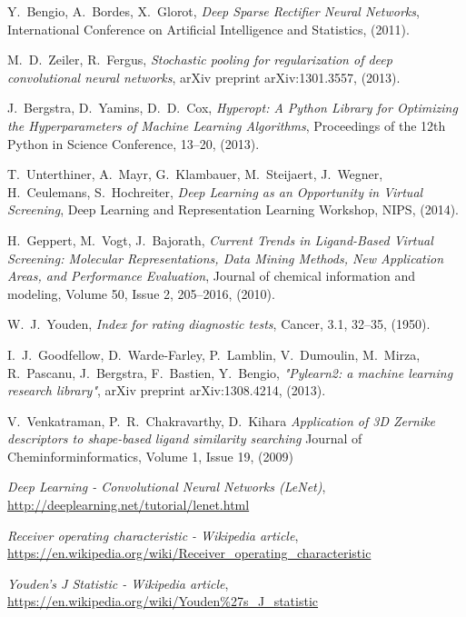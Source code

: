 \documentclass[a4paper,10pt]{report}
\begin{document}
\begin{thebibliography}{99}
      Y.~Bengio, A.~Bordes, X.~Glorot,
      \emph{Deep Sparse Rectifier Neural Networks},
      International Conference on Artificial Intelligence and Statistics,
      (2011).
      
      M.~D.~Zeiler, R.~Fergus,
      \emph{Stochastic pooling for regularization of deep convolutional neural networks},
      arXiv preprint arXiv:1301.3557,
      (2013).
      
     
     J.~Bergstra, D.~Yamins, D.~D.~Cox,
     \emph{Hyperopt: A Python Library for Optimizing the Hyperparameters of Machine Learning Algorithms},
     Proceedings of the 12th Python in Science Conference, 13--20,
     (2013).
      
    T.~Unterthiner, A.~Mayr, G.~Klambauer, M.~Steijaert, J.~Wegner, H.~Ceulemans, S.~Hochreiter,
    \textit{Deep Learning as an Opportunity in Virtual Screening},
    Deep Learning and Representation Learning Workshop, NIPS,
    (2014).
    
    H.~Geppert, M.~Vogt, J.~Bajorath,
    \textit{Current Trends in Ligand-Based Virtual Screening: Molecular Representations, Data Mining Methods, New Application Areas, and Performance Evaluation},
    Journal of chemical information and modeling, Volume 50, Issue 2, 205--2016,
    (2010).

     W.~J.~Youden,
     \emph{Index for rating diagnostic tests},
     Cancer, 3.1, 32--35,
     (1950).

      I.~J.~Goodfellow, D.~Warde-Farley, P.~Lamblin, V.~Dumoulin, M.~Mirza, R.~Pascanu, J.~Bergstra, F.~Bastien, Y.~Bengio,
      \textit{"Pylearn2: a machine learning research library"},
     arXiv preprint arXiv:1308.4214,
     (2013).
      
    V.~Venkatraman, P.~R.~Chakravarthy, D.~Kihara
    \textit{Application of 3D Zernike descriptors to shape-based ligand similarity searching}
    Journal of Cheminforminformatics, Volume 1, Issue 19, 
    (2009)
      

      \textit{Deep Learning - Convolutional Neural Networks (LeNet)},
      \url{http://deeplearning.net/tutorial/lenet.html}

     \textit{Receiver operating characteristic - Wikipedia article},
     \url{https://en.wikipedia.org/wiki/Receiver_operating_characteristic}
     
     \textit{Youden's J Statistic - Wikipedia article},
     \url{https://en.wikipedia.org/wiki/Youden%27s_J_statistic}
     
     
     

    

    
     
    
  \end{thebibliography}
  
    
\end{document}
